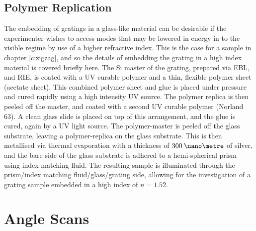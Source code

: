 \subsection{Polymer Replication}
The embedding of gratings in a glass-like material can be desirable if the experimenter wishes to access modes that may be lowered in energy in to the visible regime by use of a higher refractive index. This is the case for a sample in chapter \ref{c:zigzag}, and so the details of embedding the grating in a high index material is covered briefly here. 
The Si master of the grating, prepared via EBL, and RIE, is coated with a UV curable polymer and a thin, flexible polymer sheet (acetate sheet). This combined polymer sheet and glue is placed under pressure and cured rapidly using a high intensity UV source. The polymer replica is then peeled off the master, and coated with a second UV curable polymer (Norland 63). A clean glass slide is placed on top of this arrangement, and the glue is cured, again by a UV light source. The polymer-master is peeled off the glass substrate, leaving a polymer-replica on the glass substrate. This is then metallised via thermal evaporation with a thickness of $300\:\nano\metre$ of silver, and the bare side of the glass substrate is adhered to a hemi-spherical prism using index matching fluid. The resulting sample is illuminated through the prism/index matching fluid/glass/grating side, allowing for the investigation of a grating sample embedded in a high index of $n=1.52$. 

\section{Angle Scans \label{sec:anglescans}}
